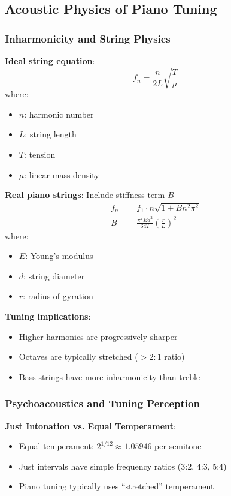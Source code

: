 \documentclass[11pt,a4paper]{article}
\begin{document}
\subsection{Acoustic Physics of Piano Tuning}

\subsubsection{Inharmonicity and String Physics}

\textbf{Ideal string equation}:
\begin{equation}
f_n = \frac{n}{2L} \sqrt{\frac{T}{\mu}}
\end{equation}
where:
\begin{itemize}
    \item $n$: harmonic number
    \item $L$: string length
    \item $T$: tension
    \item $\mu$: linear mass density
\end{itemize}

\textbf{Real piano strings}: Include stiffness term $B$
\begin{align}
f_n &= f_1 \cdot n \sqrt{1 + Bn^2\pi^2} \\
B &= \frac{\pi^2 E d^2}{64T} \left(\frac{r}{L}\right)^2
\end{align}
where:
\begin{itemize}
    \item $E$: Young's modulus
    \item $d$: string diameter
    \item $r$: radius of gyration
\end{itemize}

\textbf{Tuning implications}:
\begin{itemize}
    \item Higher harmonics are progressively sharper
    \item Octaves are typically stretched ($>2:1$ ratio)
    \item Bass strings have more inharmonicity than treble
\end{itemize}

\subsubsection{Psychoacoustics and Tuning Perception}

\textbf{Just Intonation vs. Equal Temperament}:
\begin{itemize}
    \item Equal temperament: $2^{1/12} \approx 1.05946$ per semitone
    \item Just intervals have simple frequency ratios (3:2, 4:3, 5:4)
    \item Piano tuning typically uses ``stretched'' temperament
\end{itemize}
\end{document}
